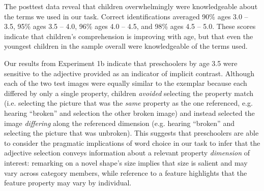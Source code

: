 \documentclass[10pt,letterpaper]{article}
\begin{document}

The posttest data reveal that children overwhelmingly were  knowledgeable about the terms we used in our task.  Correct identifications averaged 90\% ages 3.0 -- 3.5, 95\% ages 3.5 -- 4.0, 96\% ages 4.0 -- 4.5, and 98\% ages 4.5 -- 5.0.  These scores indicate that children's comprehension is improving with age, but that even the youngest children in the sample overall were knowledgeable of the terms used. 





Our results from Experiment 1b indicate that preschoolers by age 3.5 were sensitive to the adjective provided as an indicator of implicit contrast.  Although each of the two test images were equally similar to the exemplar because each differed by only a single property, children \emph{avoided} selecting the property match (i.e. selecting the picture that was the \emph{same} property as the one referenced, e.g. hearing ``broken'' and selection the other broken image) and instead selected the image \emph{differing} along the referenced dimension (e.g. hearing ``broken'' and selecting the picture that was unbroken). This suggests that preschoolers are able to consider the pragmatic implications of word choice in our task to infer that the adjective selection conveys information about a relevant property \emph{dimension} of interest: remarking on a novel shape's size implies that size is salient and may vary across category members, while reference to a feature highlights that the feature property may vary by individual.  
\end{document}
